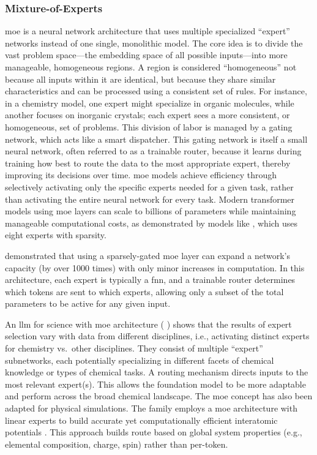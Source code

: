 \subsubsection{Mixture-of-Experts} \label{sec:arch-moes}
\gls{moe} is a neural network architecture that uses multiple specialized \enquote{expert} networks instead of one single, monolithic model. The core idea is to divide the vast problem space---the embedding space of all possible inputs---into more manageable, homogeneous regions. A region is considered \enquote{homogeneous} not because all inputs within it are identical, but because they share similar characteristics and can be processed using a consistent set of rules. For instance, in a chemistry model, one expert might specialize in organic molecules, while another focuses on inorganic crystals; each expert sees a more consistent, or homogeneous, set of problems. This division of labor is managed by a gating network, which acts like a smart dispatcher. This gating network is itself a small neural network, often referred to as a trainable router, because it learns during training how best to route the data to the most appropriate expert, thereby improving its decisions over time.
\gls{moe} models achieve efficiency through selectively activating only the specific experts needed for a given task, rather than activating the entire neural network for every task. Modern transformer models using \gls{moe} layers can scale to billions of parameters while maintaining manageable computational costs, as demonstrated by models like , which uses eight experts with sparsity.

\textcite{shazeer2017outrageously} demonstrated that using a sparsely-gated \gls{moe} layer can expand a network’s capacity (by over 1000 times) with only minor increases in computation. In this architecture, each expert is typically a \gls{fnn}, and a trainable router determines which tokens are sent to which experts, allowing only a subset of the total parameters to be active for any given input. 
 
An \gls{llm} for science with \gls{moe} architecture ( \autocite{sun2024scidfm}) shows that the results of expert selection vary with data from different disciplines, i.e., activating distinct experts for chemistry vs.\ other disciplines. They consist of multiple \enquote{expert} subnetworks, each potentially specializing in different facets of chemical knowledge or types of chemical tasks. A routing mechanism directs inputs to the most relevant expert(s). This allows the foundation model to be more adaptable and perform across the broad chemical landscape.  The \gls{moe} concept has also been adapted for physical simulations. The  family employs a \gls{moe} architecture with linear experts to build accurate yet computationally efficient interatomic potentials \autocite{wood2025uma0}. This approach builds route based on  global system properties (e.g., elemental composition, charge, spin) rather than per-token.



